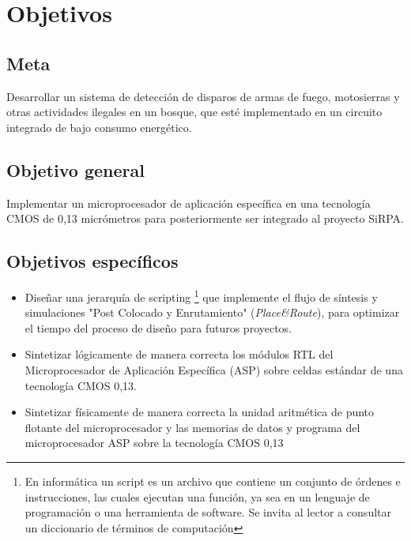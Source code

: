 \section{Objetivos}

\subsection{Meta}

Desarrollar un sistema de detección de disparos de armas de fuego, motosierras y otras actividades ilegales en un bosque, que esté implementado en un circuito integrado de bajo consumo energético.

\subsection{Objetivo general}

Implementar un microprocesador de aplicación específica en una tecnología CMOS de 0,13 micrómetros para posteriormente ser integrado al proyecto SiRPA.


\subsection{Objetivos específicos}

\begin{itemize}

\item{Diseñar una jerarquía de scripting \footnote{En informática un script es un archivo que contiene un conjunto de órdenes e instrucciones, las cuales ejecutan una función, ya sea en un lenguaje de programación o una herramienta de software. Se invita al lector a consultar un diccionario de términos de computación} que implemente el flujo de síntesis y simulaciones {"Post Colocado y Enrutamiento"} (\textit{Place\&Route}), para optimizar el tiempo del proceso de diseño para futuros proyectos.}

\item {Sintetizar lógicamente de manera correcta los módulos RTL del Microprocesador de Aplicación Específica (ASP) sobre celdas estándar de una tecnología CMOS 0,13.}

\item {Sintetizar físicamente de manera correcta la unidad aritmética de punto flotante del microprocesador y las memorias de datos y programa del microprocesador ASP sobre la tecnología CMOS 0,13}

\end{itemize}
